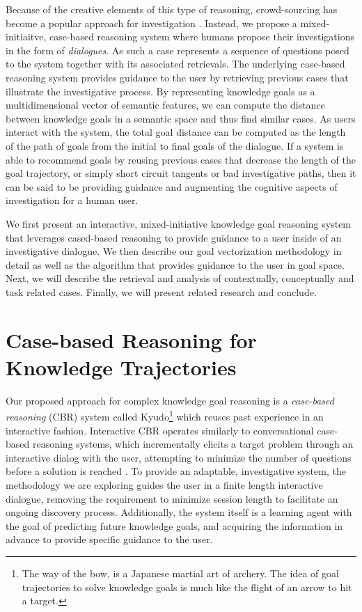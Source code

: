 \documentclass{llncs}
\begin{document}
	Because of the creative elements of this type of reasoning, crowd-sourcing has become a popular approach for investigation \cite{wang_wisdom_2013}. Instead, we propose a mixed-initiaitve, case-based reasoning system where humans propose their investigations in the form of \textit{dialogues}. As such a case represents a sequence of questions posed to the system together with its associated retrievals. The underlying case-based reasoning system provides guidance to the user by retrieving previous cases that illustrate the investigative process. By representing knowledge goals as a multidimensional vector of semantic features, we can compute the distance between knowledge goals in a semantic space and thus find similar cases. As users interact with the system, the total goal distance can be computed as the length of the path of  goals from the initial to final goals of the dialogue. If a system is able to recommend goals by reusing previous cases that decrease the length of the goal trajectory, or simply short circuit tangents or bad investigative paths, then it can be said to be providing guidance and augmenting the cognitive aspects of investigation for a human user.

	We first present an interactive, mixed-initiative knowledge goal reasoning system that leverages cased-based reasoning to provide guidance to a user inside of an investigative dialogue. We then describe our goal vectorization methodology in detail as well as the algorithm that provides guidance to the user in goal space. Next, we will describe the retrieval and analysis of contextually, conceptually and task related cases. Finally, we will present related research and conclude.
%
\section{Case-based Reasoning for Knowledge Trajectories}
%

Our proposed approach for complex knowledge goal reasoning is a \textit{case-based reasoning} (CBR) \cite{kolodner_case-based_1993,lopez_de_mantaras_retrieval_2005} system called Kyudo\footnote{The way of the bow, is a Japanese martial art of archery. The idea of goal trajectories to solve knowledge goals is much like the flight of an arrow to hit a target.} \cite{bengfort_interactive_2015} which reuses past experience in an interactive fashion. Interactive CBR operates similarly to conversational case-based reasoning systems, which incrementally elicits a target problem through an interactive dialog with the user, attempting to minimize the number of questions before a solution is reached \cite{aha_advances_2005}. To provide an adaptable, investigative system, the methodology we are exploring guides the user in a finite length interactive dialogue, removing the requirement to minimize session length to facilitate an ongoing discovery process. Additionally, the system itself is a learning agent with the goal of predicting future knowledge goals, and acquiring the information in advance to provide specific guidance to the user.
%
\end{document}
